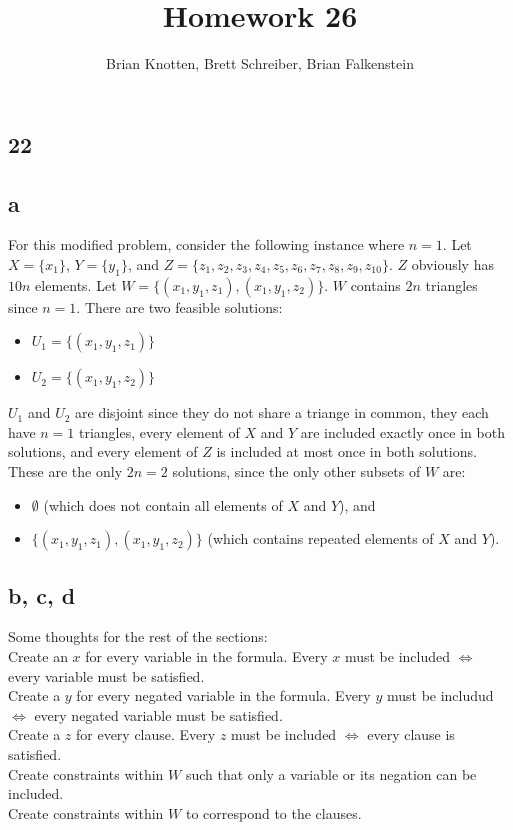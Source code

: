\documentclass[letterpaper,notitlepage,twoside]{article}
\renewcommand{\iff}{\Leftrightarrow} %
\begin{document}
\title{Homework 26}
\author{Brian Knotten, Brett Schreiber, Brian Falkenstein}
\maketitle
\subsection*{22}
\subsection*{a}
For this modified problem, consider the following instance where $n = 1$. Let $X = \{x_1\}$, $Y = \{y_1\}$, and $Z = \{z_1, z_2, z_3, z_4, z_5, z_6, z_7, z_8, z_9, z_10\}$. $Z$ obviously has $10n$ elements. Let $W = \{(x_1, y_1, z_1), (x_1, y_1, z_2)\}$. $W$ contains $2n$ triangles since $n = 1$. There are two feasible solutions:
\begin{itemize}
\item $U_1 = \{(x_1, y_1, z_1)\}$
\item $U_2 = \{(x_1, y_1, z_2)\}$
\end{itemize}
$U_1$ and $U_2$ are disjoint since they do not share a triange in common, they each have $n = 1$ triangles, every element of $X$ and $Y$ are included exactly once in both solutions, and every element of $Z$ is included at most once in both solutions. These are the only $2n = 2$ solutions, since the only other subsets of $W$ are:
\begin{itemize}
\item $\emptyset$ (which does not contain all elements of $X$ and $Y$), and
\item $\{(x_1, y_1, z_1), (x_1, y_1, z_2)\}$ (which contains repeated elements of $X$ and $Y$).
\end{itemize}
\subsection*{b, c, d}
Some thoughts for the rest of the sections:\\
Create an $x$ for every variable in the formula. Every $x$ must be included $\iff$ every variable must be satisfied. \\
Create a $y$ for every negated variable in the formula. Every $y$ must be includud $\iff$ every negated variable must be satisfied. \\
Create a $z$ for every clause. Every $z$ must be included $\iff$ every clause is satisfied. \\
Create constraints within $W$ such that only a variable or its negation can be included.\\
Create constraints within $W$ to correspond to the clauses.\\
\end{document}

